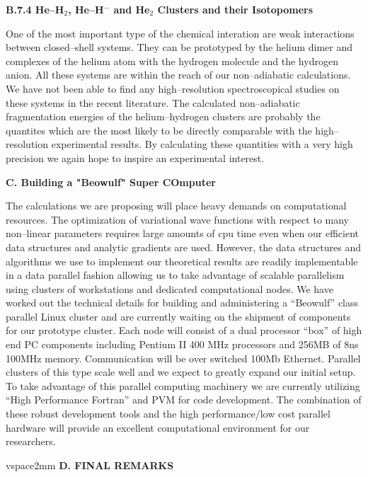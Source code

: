 {{\vspace{2mm}
\noindent
{\bf B.7.4
He--H$_2$, He--H$^-$ and He$_2$ Clusters and their Isotopomers}

One of the most important type of the chemical 
interation 
are weak interactions between closed--shell systems.
They can be prototyped by the helium dimer and
complexes of the helium atom with the hydrogen molecule
and the hydrogen anion. All these systems are within
the reach of our non--adiabatic calculations.
We have not been able to find any high--resolution 
spectroscopical studies on these systems in the recent
literature. The calculated non--adiabatic
fragmentation energies of the
helium--hydrogen clusters 
are probably the quantites which  
are the most likely to be directly comparable 
with the high--resolution experimental results.    
By calculating these quantities with a very high
precision we again hope to inspire an experimental interest.  


\vspace{2mm}
\noindent
{\bf C. Building a "Beowulf" Super COmputer}

The calculations we are proposing will place heavy demands on computational
resources. The optimization of variational wave functions with
respect to many non--linear parameters requires large amounts of
cpu time even when our efficient data structures and analytic gradients
are used. However, the data structures and algorithms we use to implement
our theoretical results are readily implementable in a data parallel fashion
allowing us to take advantage of scalable  parallelism using clusters
of workstations and dedicated computational nodes. We have worked out
the technical details for building and administering
a ``Beowulf''\cite{beowulfwww} class
parallel Linux cluster and are currently waiting on the shipment of
components for our prototype cluster. Each node
will consist of a dual processor ``box'' of high end
PC components including Pentium II 400 MHz processors and
256MB of 8ns 100MHz memory. Communication will be over
switched 100Mb Ethernet. Parallel clusters of this type
scale well and we expect to greatly expand our initial setup.
To take advantage of this parallel computing machinery we are  currently
utilizing ``High Performance Fortran'' \cite{HPFwww}
and PVM \cite{PVMwww} for code development. The combination of these
robust development tools and the high performance/low cost parallel hardware
will provide an excellent computational environment for our researchers.


vspace{2mm}
\noindent
{\bf D. FINAL REMARKS}

}}
